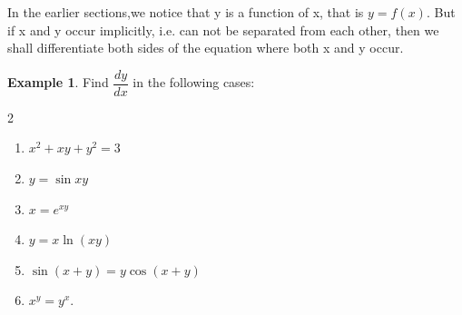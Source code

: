 \documentclass[../../main.tex]{subfiles}
\theoremstyle{definition}
\newtheorem{example}{Example}[section]
\begin{document}
 In the earlier sections,we notice that y is a function of x, that is $y=f(x)$. But if x and y occur implicitly, i.e. can not be separated from each other, then we shall differentiate both sides of the equation where both x and y occur.
 
\begin{example}
Find $\dfrac{dy}{dx}$ in the following cases: 
\begin{multicols}{2}
\begin{enumerate}[label=(\roman*)]
    \item $x^2+xy+y^2=3$
    \item $y=\sin xy$
    \item $x=e^{xy}$ 
    \item $y=x\ln (xy)$
    \item $\sin (x+y)=y \cos (x+y)$
    \item $x^y=y^x$.
\end{enumerate}
\end{multicols}
\end{example}
\end{document}
